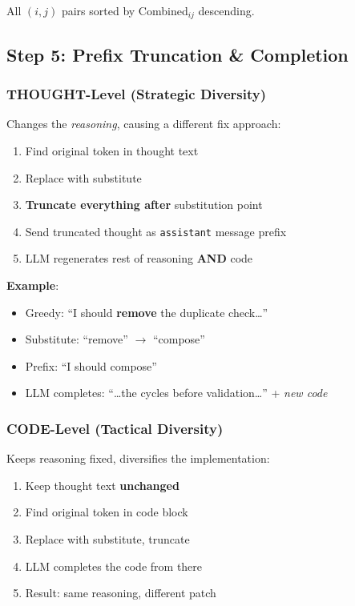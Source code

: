 \documentclass[10pt,a4paper,twocolumn]{article}
\begin{document}
All $(i, j)$ pairs sorted by Combined$_{ij}$ descending.

\subsection{Step 5: Prefix Truncation \& Completion}

\subsubsection{THOUGHT-Level (Strategic Diversity)}

Changes the \emph{reasoning}, causing a different fix approach:

\begin{algobox}[title=Thought Substitution]
\begin{enumerate}[nosep,leftmargin=10pt]
\item Find original token in thought text
\item Replace with substitute
\item \textbf{Truncate everything after} substitution point
\item Send truncated thought as \texttt{assistant} message prefix
\item LLM regenerates rest of reasoning \textbf{AND} code
\end{enumerate}
\end{algobox}

\textbf{Example}:
\begin{small}
\begin{itemize}[nosep]
\item Greedy: ``I should \textbf{remove} the duplicate check\ldots''
\item Substitute: ``remove'' $\to$ ``compose''
\item Prefix: ``I should compose''
\item LLM completes: ``\ldots the cycles before validation\ldots'' + \emph{new code}
\end{itemize}
\end{small}

\subsubsection{CODE-Level (Tactical Diversity)}

Keeps reasoning fixed, diversifies the implementation:

\begin{algobox}[title=Code Substitution]
\begin{enumerate}[nosep,leftmargin=10pt]
\item Keep thought text \textbf{unchanged}
\item Find original token in code block
\item Replace with substitute, truncate
\item LLM completes the code from there
\item Result: same reasoning, different patch
\end{enumerate}
\end{algobox}
\end{document}
